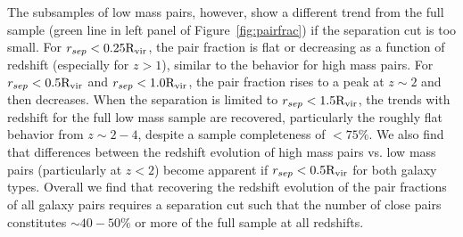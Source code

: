 \documentclass[twocolumn]{aastex631}
\newcommand{\Rvir}{\ensuremath{\rm R_{vir}}}
\begin{document}
    The subsamples of low mass pairs, however, show a different trend from the full sample (green line in left panel of Figure~\ref{fig:pairfrac}) if the separation cut is too small. 
    For $r_{sep} < 0.25\Rvir$, the pair fraction is flat or decreasing as a function of redshift (especially for $z>1$), similar to the behavior for high mass pairs. 
    For $r_{sep} < 0.5\Rvir$ and $r_{sep} < 1.0\Rvir$, the pair fraction rises to a peak at $z\sim2$ and then decreases. 
    When the separation is limited to $r_{sep} < 1.5\Rvir$, the trends with redshift for the full low mass sample are recovered, particularly the roughly flat behavior from $z\sim2-4$, despite a sample completeness of $<75\%$. 
    We also find that differences between the redshift evolution of high mass pairs vs. low mass pairs (particularly at $z<2$) become apparent if $r_{sep} < 0.5\Rvir$ for both galaxy types. 
    Overall we find that recovering the redshift evolution of the pair fractions of all galaxy pairs requires a separation cut such that the number of close pairs constitutes $\sim40-50\%$ or more of the full sample at all redshifts. 
\end{document}
